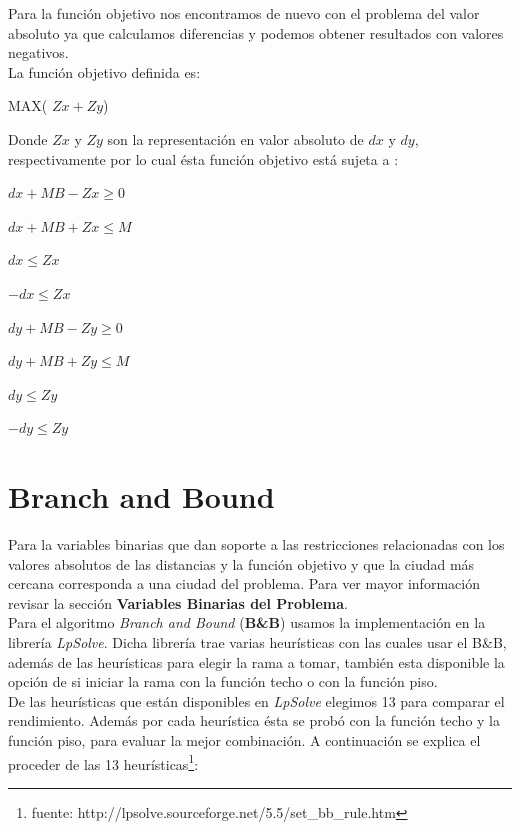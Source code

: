 \documentclass[10pt]{article}
\begin{document}
Para la funci\'on objetivo nos encontramos de nuevo con el problema del valor absoluto ya que calculamos diferencias y podemos obtener resultados con valores negativos.\\

La función objetivo definida es: 

\begin{center}
      MAX( $Zx + Zy$)
\end{center}

Donde $Zx$ y $Zy$ son la representaci\'on en valor absoluto de $dx$ y $dy$, respectivamente por lo cual ésta funci\'on objetivo está sujeta a : 

\begin{center}
$dx + MB - Zx \geq 0 $

$dx + MB + Zx \leq M $

$dx \leq Zx $

$-dx \leq Zx$

\end{center}


\begin{center}
$dy + MB - Zy \geq 0 $

$dy + MB + Zy \leq M $

$dy \leq Zy $

$-dy \leq Zy$

\end{center}

\newpage

\section{Branch and Bound}

Para la variables binarias que dan soporte a las restricciones relacionadas con los valores absolutos de las distancias y la función objetivo y que la ciudad más cercana corresponda
a una ciudad del problema. Para ver mayor información revisar la sección \textbf{Variables Binarias del Problema}.\\

Para el algoritmo \emph{Branch and Bound} (\textbf{B\&B}) usamos la implementación en la librería \emph{LpSolve}. Dicha librería trae varias heurísticas con las cuales usar
el B\&B, además de las heurísticas para elegir la rama a tomar, también esta disponible la opción de si iniciar la rama con la función techo o con la función piso.\\

De las heurísticas que están disponibles en \emph{LpSolve} elegimos 13 para comparar el rendimiento. Además por cada heurística ésta se probó con la función techo y la función piso, para 
evaluar la mejor combinación. A continuación se explica el proceder de las 13 heurísticas\footnote{fuente: http://lpsolve.sourceforge.net/5.5/set\_bb\_rule.htm}:
\end{document}
